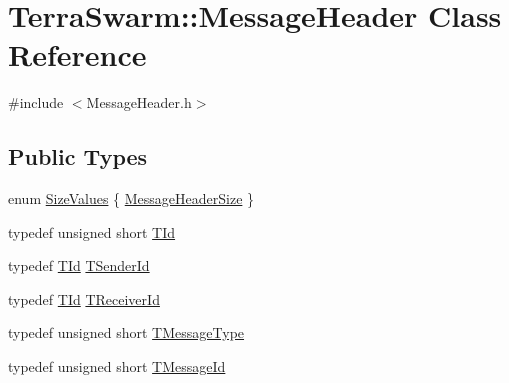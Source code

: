 \hypertarget{class_terra_swarm_1_1_message_header}{\section{Terra\-Swarm\-:\-:Message\-Header Class Reference}
\label{class_terra_swarm_1_1_message_header}
}


{\ttfamily \#include $<$Message\-Header.\-h$>$}

\subsection*{Public Types}
\begin{DoxyCompactItemize}
\item 
enum \hyperlink{class_terra_swarm_1_1_message_header_aa1066aaf03d8443ecda7e4c9b8e60fce}{Size\-Values} \{ \hyperlink{class_terra_swarm_1_1_message_header_aa1066aaf03d8443ecda7e4c9b8e60fcea421e8aff7e21d86fb408624a2963e8b9}{Message\-Header\-Size}
 \}
\item 
typedef unsigned short \hyperlink{class_terra_swarm_1_1_message_header_ab55de822fadad758edcd8f36bd07676e}{T\-Id}
\item 
typedef \hyperlink{class_terra_swarm_1_1_message_header_ab55de822fadad758edcd8f36bd07676e}{T\-Id} \hyperlink{class_terra_swarm_1_1_message_header_a516b36855e2aad7cfbf8770f1b42784f}{T\-Sender\-Id}
\item 
typedef \hyperlink{class_terra_swarm_1_1_message_header_ab55de822fadad758edcd8f36bd07676e}{T\-Id} \hyperlink{class_terra_swarm_1_1_message_header_aa3260702b182b6f88ddbdd3416e98df0}{T\-Receiver\-Id}
\item 
typedef unsigned short \hyperlink{class_terra_swarm_1_1_message_header_a6eaf3733d65fa5eaac0c223da4f5670c}{T\-Message\-Type}
\item 
typedef unsigned short \hyperlink{class_terra_swarm_1_1_message_header_acc3ebce9679077b0e438532be7c7bf6d}{T\-Message\-Id}
\end{DoxyCompactItemize}
